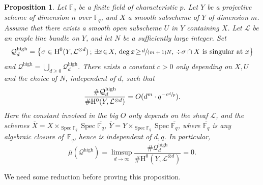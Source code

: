 \documentclass[JEP,XML,SOM,Unicode,published]{cedram}
\newcommand{\sep}{\,;\,}
\theoremstyle{plain}
\newtheorem{prop}[thm]{Proposition}
\theoremstyle{definition}
\newcommand{\ho}{\mathrm{H}}
\newcommand{\li}{\mathcal{L}}
\newcommand{\F}{\mathbb{F}}
\DeclareMathOperator{\Spec}{Spec}
\begin{document}
\begin{prop}\label{hifinite}
Let $\F_q$ be a finite field of characteristic $p$. Let $Y$ be a projective scheme of dimension $n$ over $\F_q$, and $X$ a smooth subscheme of $Y$ of dimension $m$. Assume that there exists a smooth open subscheme $U$ in $Y$ containing $X$. Let $\mathcal{L}$ be an ample line bundle on $Y$, and let $N$ be a sufficiently large integer.
Set\vspace*{-3pt}
\[
\mathcal{Q}_{d}^{\mathrm{high}}= \bigl\{ \sigma\in \ho^0(Y,\li^{\otimes d})\sep \exists x\!\in\!X,\, \deg x\!\geq\! \sfrac{d}{(m+1)N},\,\div \sigma\cap X \text{ is singular at }x \bigl\}
\]
and $\mathcal{Q}^{\mathrm{high}}=\bigcup_{d\geq 0}\mathcal{Q}_{d}^{\mathrm{high}}$.
There exists a constant $c>0$ only depending on $X,U$ and the choice of $N$, independent of $d$, such that\vspace*{-3pt}\enlargethispage{\baselineskip}
\[
\frac{ \#\mathcal{Q}_d^{\mathrm{high}}}{\# \ho^0(Y, \mathcal{L}^{\otimes d})}=O(d^{m}\cdot q^{-c\sfrac{d}{p}}).
\]
Here the constant involved in the big $O$ only depends on the sheaf $\li$, and the schemes $\overline{X}=X\times_{\Spec \F_q}\Spec \overline{\F_q}$, $\overline{Y}=Y\times_{\Spec \F_q}\Spec \overline{\F_q}$, where $\overline{\F_q}$ is any algebraic closure of~$\F_q$, hence is independent of $d,q$.
In particular,\vspace*{-3pt}
\[
\overline{\mu}(\mathcal{Q}^{\mathrm{high}})=\limsup_{d\to \infty} \frac{ \#\mathcal{Q}_d^{\mathrm{high}}}{\# \ho^0(Y, \mathcal{L}^{\otimes d})}=0.
\]
\end{prop}

We need some reduction before proving this proposition.
\end{document}
